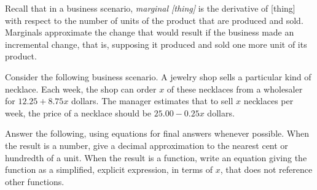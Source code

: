 \label{sec:biz-mod-marginal}

Recall that in a business scenario, \emph{marginal [thing]} is the derivative of [thing] with respect to the number of units of the product that are produced and sold.
Marginals approximate the change that would result if the business made an incremental change, that is, supposing it produced and sold one more unit of its product.




Consider the following business scenario.
A jewelry shop sells a particular kind of necklace.
Each week, the shop can order $x$ of these necklaces from a wholesaler for $12.25 + 8.75 x$ dollars.
The manager estimates that to sell $x$ necklaces per week, the price of a necklace should be $25.00 - 0.25 x$ dollars.

Answer the following, using equations for final answers whenever possible.
When the result is a number, give a decimal approximation to the nearest cent or hundredth of a unit.
When the result is a function, write an equation giving the function as a simplified, explicit expression, in terms of $x$, that does not reference other functions.

